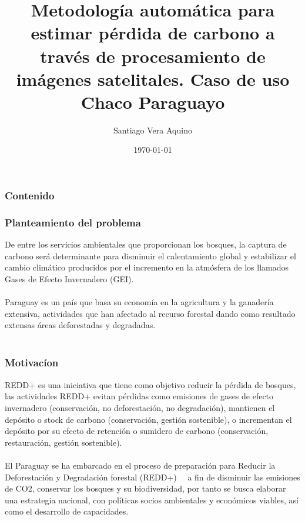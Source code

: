 \documentclass[xcolor=table]{beamer}
\title[Perdida de Carbono]{Metodolog\'ia autom\'atica para estimar p\'erdida de	carbono a trav\'es de procesamiento de im\'agenes
	satelitales. Caso de uso Chaco Paraguayo} %
\author{Santiago Vera Aquino} %
\institute[FP-UNA] %
{
Universidad Nacional de Asunci\'on \\ %
Facultad Polit\'ecnica \\
Ingenier\'ia en Inform\'atica \\
\medskip
\textit{Proyecto Final de grado} %
}
\date{\today} %
\begin{document}
\begin{frame}
\titlepage %
\end{frame}


	\begin{frame}
		\frametitle{Contenido}
	\end{frame}


\begin{frame}
\frametitle{Planteamiento del problema}

De entre los servicios ambientales que proporcionan los bosques, la captura de carbono ser\'a determinante para disminuir el calentamiento global y estabilizar el cambio clim\'atico producidos por el incremento en la atm\'osfera de los llamados Gases de Efecto Invernadero (GEI).\\~\\
Paraguay es un pa\'is que basa su econom\'ia en la agricultura y la ganader\'ia extensiva, actividades que han afectado al recurso forestal dando como resultado extensas \'areas deforestadas y degradadas.\\~\\

\end{frame}

\begin{frame}
	\frametitle{Motivac\'ion}
REDD+ es una iniciativa que tiene como objetivo reducir la p\'erdida de bosques, las actividades REDD+ evitan p\'erdidas como emisiones de gases de efecto invernadero (conservaci\'on, no deforestaci\'on, no degradaci\'on), mantienen el dep\'osito o stock de carbono (conservaci\'on, gesti\'on sostenible), o incrementan el dep\'osito por su efecto de retenci\'on o sumidero de carbono (conservaci\'on, restauraci\'on, gesti\'on sostenible).\\~\\
	
El Paraguay se ha embarcado en el proceso de preparaci\'on para Reducir la Deforestaci\'on y Degradaci\'on forestal (REDD+)   a fin de disminuir las emisiones de CO2, conservar los bosques y su biodiversidad, por tanto se busca elaborar una estrategia nacional, con pol\'iticas socios ambientales y econ\'omicos viables, as\'i como el desarrollo de capacidades.
	
	
\end{frame}
\end{document}
